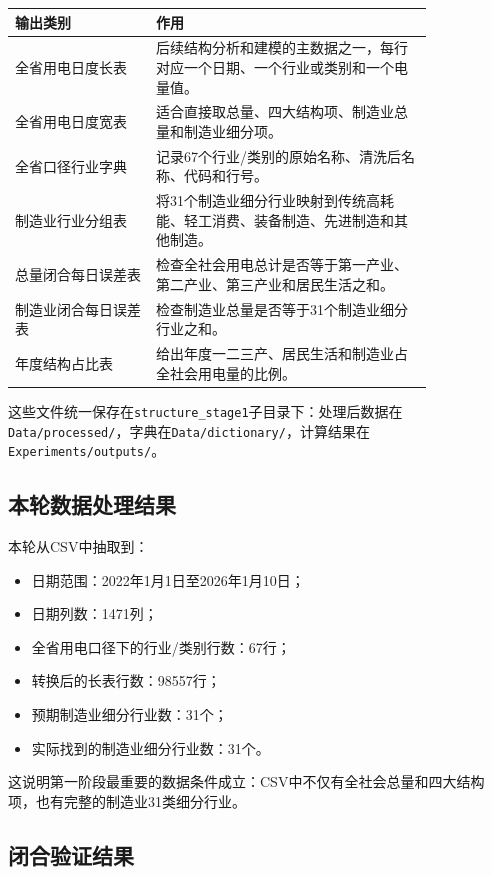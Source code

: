 \documentclass[UTF8,a4paper,11pt]{ctexart}
\begin{document}
\begin{longtable}{p{0.28\linewidth}p{0.55\linewidth}}
\toprule
输出类别 & 作用 \\
\midrule
全省用电日度长表 & 后续结构分析和建模的主数据之一，每行对应一个日期、一个行业或类别和一个电量值。\\
全省用电日度宽表 & 适合直接取总量、四大结构项、制造业总量和制造业细分项。\\
全省口径行业字典 & 记录67个行业/类别的原始名称、清洗后名称、代码和行号。\\
制造业行业分组表 & 将31个制造业细分行业映射到传统高耗能、轻工消费、装备制造、先进制造和其他制造。\\
总量闭合每日误差表 & 检查全社会用电总计是否等于第一产业、第二产业、第三产业和居民生活之和。\\
制造业闭合每日误差表 & 检查制造业总量是否等于31个制造业细分行业之和。\\
年度结构占比表 & 给出年度一二三产、居民生活和制造业占全社会用电量的比例。\\
\bottomrule
\end{longtable}

这些文件统一保存在\texttt{structure\_stage1}子目录下：处理后数据在\texttt{Data/processed/}，字典在\texttt{Data/dictionary/}，计算结果在\texttt{Experiments/outputs/}。

\subsection{本轮数据处理结果}

本轮从CSV中抽取到：
\begin{itemize}
  \item 日期范围：2022年1月1日至2026年1月10日；
  \item 日期列数：1471列；
  \item 全省用电口径下的行业/类别行数：67行；
  \item 转换后的长表行数：98557行；
  \item 预期制造业细分行业数：31个；
  \item 实际找到的制造业细分行业数：31个。
\end{itemize}

这说明第一阶段最重要的数据条件成立：CSV中不仅有全社会总量和四大结构项，也有完整的制造业31类细分行业。

\subsection{闭合验证结果}
\end{document}
